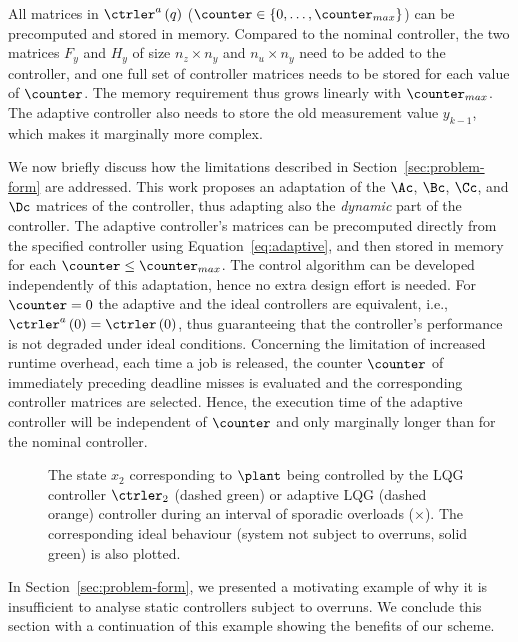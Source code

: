 All matrices in $\ctrler^a\funof{q}$ ($\counter \in \{0, \ldots, \counter_{max}\}$) can be precomputed and stored in memory.
Compared to the nominal controller, the two matrices $F_y$ and $H_y$ of size $n_z \times n_y$ and $n_u \times n_y$ need to be added to the controller, and one full set of controller matrices needs to be stored for each value of $\counter$.
The memory requirement thus grows linearly with $\counter_{max}$.
The adaptive controller also needs to store the old measurement value $y_{k-1}$, which makes it marginally more complex.

We now briefly discuss how the limitations described in Section~\ref{sec:problem-form} are addressed.
This work proposes an adaptation of the $\Ac$, $\Bc$, $\Cc$, and $\Dc$ matrices of the controller, thus adapting also the \emph{dynamic} part of the controller.
The adaptive controller's matrices can be precomputed directly from the specified controller using Equation~\eqref{eq:adaptive}, and then stored in memory for each $\counter \leq \counter_{max}$.
The control algorithm can be developed independently of this adaptation, hence no extra design effort is needed.
For $\counter=0$ the adaptive and the ideal controllers are equivalent, i.e., $\ctrler^a\funof{0} = \ctrler\funof{0}$, thus guaranteeing that the controller's performance is not degraded under ideal conditions.
Concerning the limitation of increased runtime overhead, each time a job is released, the counter $\counter$ of immediately preceding deadline misses is evaluated and the corresponding controller matrices are selected.
Hence, the execution time of the adaptive controller will be independent of $\counter$ and only marginally longer than for the nominal controller.

\begin{figure}[tp!]
    \centerline{}
    \caption{The state $x_2$ corresponding to $\plant$ being controlled by the LQG controller $\ctrler_2$ (dashed green) or adaptive LQG (dashed orange) controller during an interval of sporadic overloads ($\times$).
        The corresponding ideal behaviour (system not subject to overruns, solid green) is also plotted.}
    \label{fig:lqgs-lqgd}
\end{figure}

In Section~\ref{sec:problem-form}, we presented a motivating example of why it is insufficient to analyse static controllers subject to overruns.
We conclude this section with a continuation of this example showing the benefits of our scheme.

